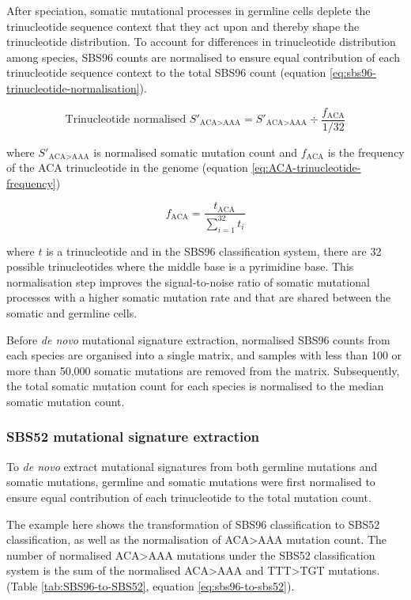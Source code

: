 After speciation, somatic mutational processes in germline cells deplete the trinucleotide sequence context that they act upon and thereby shape the trinucleotide distribution. To account for differences in trinucleotide distribution among species, SBS96 counts are normalised to ensure equal contribution of each trinucleotide sequence context to the total SBS96 count (equation \ref{eq:sbs96-trinucleotide-normalisation}). 

\begin{equation} 
\label{eq:sbs96-trinucleotide-normalisation}
\text{Trinucleotide normalised } S'_{\text{ACA>AAA}} = S'_{\text{ACA>AAA}} \div \frac{f_{\text{ACA}}}{1/32}
\end{equation}

where $S'_{\text{ACA>AAA}}$ is normalised somatic mutation count and $f_{\text{ACA}}$ is the frequency of the ACA trinucleotide in the genome (equation \ref{eq:ACA-trinucleotide-frequency})

\begin{equation}
\label{eq:ACA-trinucleotide-frequency}
f_{\text{ACA}} = \frac{t_{\text{ACA}}}{\sum^{32}_{i=1}t_{i}}
\end{equation}

where $t$ is a trinucleotide and in the SBS96 classification system, there are 32 possible trinucleotides where the middle base is a pyrimidine base. This normalisation step improves the signal-to-noise ratio of somatic mutational processes with a higher somatic mutation rate and that are shared between the somatic and germline cells.

Before \textit{de novo} mutational signature extraction, normalised SBS96 counts from each species are organised into a single matrix, and samples with less than 100 or more than 50,000 somatic mutations are removed from the matrix. Subsequently, the total somatic mutation count for each species is normalised to the median somatic mutation count. 

\subsubsection{SBS52 mutational signature extraction}

To \textit{de novo} extract mutational signatures from both germline mutations and somatic mutations, germline and somatic mutations were first normalised to ensure equal contribution of each trinucleotide to the total mutation count. 

The example here shows the transformation of SBS96 classification to SBS52 classification, as well as the normalisation of ACA>AAA mutation count. The number of normalised ACA>AAA mutations under the SBS52 classification system is the sum of the normalised ACA>AAA and TTT>TGT mutations. (Table \ref{tab:SBS96-to-SBS52}, equation \ref{eq:sbs96-to-sbs52}).

